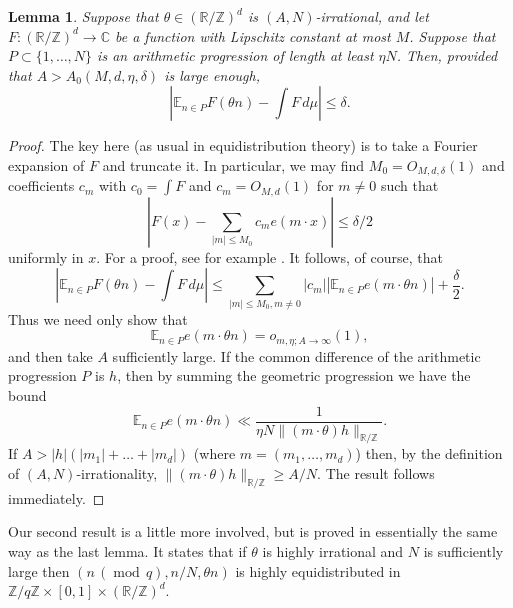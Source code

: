 \documentclass[10pt,reqno]{amsart}
\newtheorem{lemma}[theorem]{Lemma}
\theoremstyle{definition}
\theoremstyle{remark}
\newcommand{\md}[1]{\ensuremath{\,(\operatorname{mod}\, #1)}}
\renewcommand{\leq}{\leqslant}
\renewcommand{\geq}{\geqslant}
\def\R{\mathbb{R}}
\def\C{\mathbb{C}}
\def\Z{\mathbb{Z}}
\def\E{\mathbb{E}}
\numberwithin{equation}{section}
\begin{document}
\begin{lemma}\label{distribution-integral-a}
Suppose that $\theta \in (\R/\Z)^d$ is $(A, N)$-irrational, and let $F : (\R/\Z)^d \rightarrow \C$ be a function with Lipschitz constant at most $M$. Suppose that $P \subset \{1,\dots, N\}$ is an arithmetic progression of length at least $\eta N$. Then, provided that $A > A_0(M, d, \eta, \delta)$ is large enough,
\[ \left|\E_{n \in P} F(\theta n) - \int F \, d\mu \right| \leq \delta.\]
\end{lemma}
\begin{proof}
The key here (as usual in equidistribution theory) is to take a Fourier expansion of $F$ and truncate it. In particular, we may find $M_0 = O_{M, d, \delta}(1)$ and coefficients $c_m$ with $c_0 = \int F$ and $c_m = O_{M,d}(1)$ for $m\neq 0$ such that
\[  \left| F(x) - \sum_{|m| \leq M_0} c_m e(m \cdot x) \right| \leq \delta/2 \]
uniformly in $x$. For a proof, see for example \cite[Lemma A.9]{green-tao-quadraticuniformity}. 
It follows, of course, that 
\[
  \left| \E_{n \in P} F(\theta n) - \int F\, d\mu \right| \leq  \sum_{|m| \leq M_0, m \neq 0} |c_m| | \E_{n \in P} e(m \cdot \theta n)| + \frac{\delta}{2}.
\]
Thus we need only show that 
\[ \E_{n \in P} e(m \cdot \theta n) = o_{m, \eta; A \rightarrow \infty}(1),\] and then take $A$ sufficiently large. If the common difference of the arithmetic progression $P$ is $h$, then by summing the geometric progression we have the bound
\[ \E_{n \in P} e(m \cdot \theta n) \ll \frac{1}{\eta N \| (m \cdot \theta) h \|_{\R/\Z}}.\] If $A > |h|(|m_1| + \dots + |m_d|)$ (where $m = (m_1,\dots, m_d)$) then, by the definition of $(A,N)$-irrationality, $\| (m \cdot \theta) h \|_{\R/\Z} \geq A/N$. The result follows immediately. 
\end{proof}

Our second result is a little more involved, but is proved in essentially the same way as the last lemma. It states that if $\theta$ is highly irrational and $N$ is sufficiently large then $(n \md{q}, n/N, \theta n)$ is highly equidistributed in $\Z/q\Z \times [0,1] \times (\R/\Z)^d$. 
\end{document}

